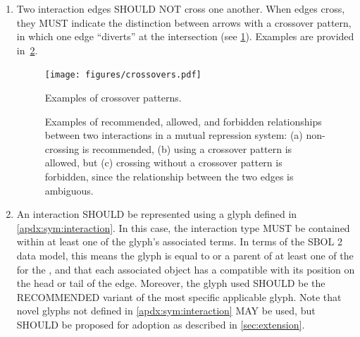 \begin{enumerate}
\item Two interaction edges SHOULD NOT cross one another.  When edges cross, they MUST indicate the distinction between arrows with a crossover pattern, in which one edge ``diverts'' at the intersection (see \ref{f:crossover}).
Examples are provided in~\ref{exa:4c}.

	\begin{figure}[h!]
	\centering
	\texttt{[image: figures/crossovers.pdf]}
	\caption{Examples of  crossover patterns.}
	\label{f:crossover}
	\end{figure}
	
	\begin{figure}[h!]
	\centering
	\caption{Examples of recommended, allowed, and forbidden relationships between two interactions in a mutual repression system: (a) non-crossing is recommended, (b) using a crossover pattern is allowed, but (c) crossing without a crossover pattern is forbidden, since the relationship between the two edges is ambiguous.}
	\label{exa:4c}
	\end{figure}

\item An interaction SHOULD be represented using a glyph defined in \ref{apdx:sym:interaction}.  In this case, the interaction type MUST be contained within at least one of the glyph's associated terms.
In terms of the SBOL 2 data model, this means the glyph is equal to or a parent of at least one of the  for the , and that each associated  object has a  compatible with its position on the head or tail of the edge.
	Moreover, the glyph used SHOULD be the RECOMMENDED variant of the most specific applicable glyph.  Note that novel glyphs not defined in \ref{apdx:sym:interaction} MAY be used, but SHOULD be proposed for adoption as described in \ref{sec:extension}.

\end{enumerate}
